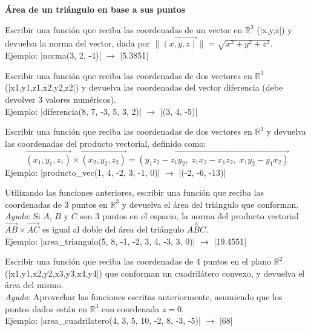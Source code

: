 \begin{ejercicio}
{\bf Área de un triángulo en base a sus puntos}
\begin{partes}
    \item Escribir una función que reciba las coordenadas de un vector en
        $\mathbb{R}^3$ (|x,y,z|) y devuelva la norma del vector, dada por
        $\lVert\overrightarrow{(x,y,z)}\rVert=\sqrt{x^2+y^2+z^2}$. \\
        Ejemplo: |norma(3, 2, -4)| $\rightarrow$ |5.3851|

    \item Escribir una función que reciba las coordenadas de dos vectores en
        $\mathbb{R}^3$ (|x1,y1,z1,x2,y2,z2|) y devuelva las coordenadas del vector
        diferencia (debe devolver 3 valores numéricos). \\
        Ejemplo: |diferencia(8, 7, -3, 5, 3, 2)| $\rightarrow$ |(3, 4, -5)|

    \item Escribir una función que reciba las coordenadas de dos vectores en
        $\mathbb{R}^3$ y devuelva las coordenadas del producto vectorial,
        definido como:
        $$\overrightarrow{(x_1, y_1, z_1)} \times \overrightarrow{(x_2, y_2, z_2)} =
        \overrightarrow{(y_1 z_2 - z_1 y_2, \; z_1 x_2 - x_1 z_2, \; x_1 y_2 - y_1 x_2)}$$
        Ejemplo: |producto_vec(1, 4, -2, 3, -1, 0)| $\rightarrow$ |(-2, -6, -13)|

    \item Utilizando las funciones anteriores, escribir una función que reciba
        las coordenadas de 3 puntos en $\mathbb{R}^3$ y devuelva el área del triángulo
        que conforman.\\
        \emph{Ayuda}: Si $A$, $B$ y $C$ son 3 puntos en el espacio, la norma del producto
        vectorial $\overrightarrow{AB} \times \overrightarrow{AC}$ es igual al doble del área del
        triángulo $\stackrel{\vartriangle}{ABC}$. \\
        Ejemplo: |area_triangulo(5, 8, -1, -2, 3, 4, -3, 3, 0)| $\rightarrow$ |19.4551|

    \item Escribir una función que reciba las coordenadas de 4 puntos en el
        plano $\mathbb{R}^2$ (|x1,y1,x2,y2,x3,y3,x4,y4|) que conforman un cuadrilátero
        convexo, y devuelva el área del mismo. \\
        \emph{Ayuda}: Aprovechar las funciones escritas anteriormente, asumiendo
        que los puntos dados están en $\mathbb{R}^3$ con coordenada $z = 0$. \\
        Ejemplo: |area_cuadrilatero(4, 3, 5, 10, -2, 8, -3, -5)| $\rightarrow$ |68|
\end{partes}
\end{ejercicio}
